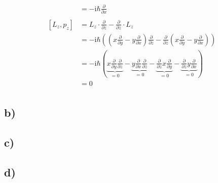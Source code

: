 \begin{align*}
        &= -\text{i}\hbar \frac{\partial}{\partial x}\\
        \\
        \left[ L_z,p_z \right] &= L_z\cdot \frac{\partial}{\partial z} - \frac{\partial}{\partial z} \cdot L_z\\
        &= -\text{i}\hbar \left( \left( x\frac{\partial}{\partial y} - y\frac{\partial}{\partial x} \right) \frac{\partial}{\partial z} - \frac{\partial}{\partial z} \left( x\frac{\partial}{\partial y} - y\frac{\partial}{\partial x} \right) \right)\\
        &= -\text{i}\hbar \left( \underbrace{x\frac{\partial}{\partial y} \frac{\partial}{\partial z}}_{=0} - \underbrace{y\frac{\partial}{\partial x} \frac{\partial}{\partial z}}_{=0} - \underbrace{\frac{\partial}{\partial z}x\frac{\partial}{\partial y}}_{=0} - \underbrace{\frac{\partial}{\partial z}y\frac{\partial}{\partial x}}_{=0} \right)\\
        &= 0\\
    \end{align*}

    \subsection{b)} 

    \subsection{c)}

    \subsection{d)}





